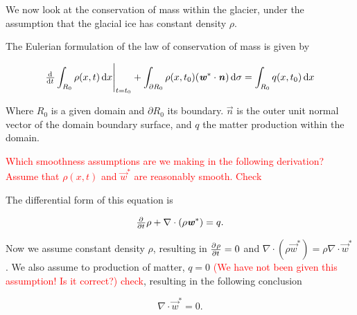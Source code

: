 We now look at the conservation of mass within the glacier, under the assumption that the glacial ice has constant density $\rho$.

The Eulerian formulation of the law of conservation of mass is given by

\begin{equation}
  \eval{\od{}{t} \int_{R_0} \rho(x, t) \dif{x}}_{t = t_0} + \int_{\partial R_0} \rho(x, t_0) (\vec{w}^* \cdot \vec{n}) \dif{\sigma} = \int_{R_0} q(x, t_0) \dif{x}
\end{equation}

Where $R_0$ is a given domain and $\partial R_0$ its boundary. $\vec{n}$ is the outer unit normal vector of the domain boundary surface, and $q$ the matter production within the domain.

\textcolor{red}{Which smoothness assumptions are we making in the following derivation? Assume that $\rho(x,t)$ and $\vec{w}^*$ are reasonably smooth. Check}

The differential form of this equation is

\begin{equation}
  \pd{}{t} \rho + \nabla \cdot (\rho \vec{w}^*) = q.
  \label{eq:conservation_of_matter_interior}
\end{equation}

Now we assume constant density $\rho$, resulting in $\pd{\rho}{t} = 0$ and $\nabla \cdot (\rho \vec{w}^*) = \rho \nabla \cdot \vec{w}^*$. We also assume to production of matter, $q = 0$ \textcolor{red}{(We have not been given this assumption! Is it correct?) check}, resulting in the following conclusion

\begin{equation} \label{eq:velocity-divergence}
  \nabla \cdot \vec{w}^* = 0.
\end{equation}
